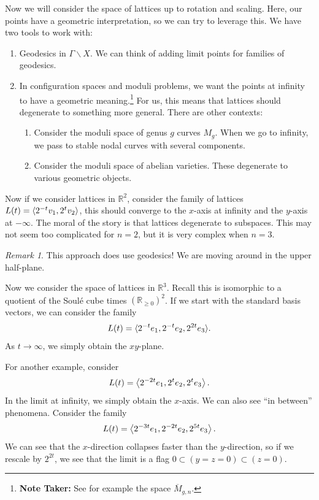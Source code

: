 \documentclass[leqno, openany]{memoir}
\DeclarePairedDelimiter{\gen}{\langle}{\rangle}
\theoremstyle{definition}
\theoremstyle{remark}
\newtheorem{rmk}[thm]{Remark}
\theoremstyle{plain}
\theoremstyle{definition}
\theoremstyle{remark}
\newcommand{\R}{\mathbb{R}}
\begin{document}
Now we will consider the space of lattices up to rotation and scaling. Here, our points have a geometric interpretation, so we can try to leverage this. We have two tools to work with:
\begin{enumerate}
    \item Geodesics in $\Gamma \backslash X$. We can think of adding limit points for families of geodesics.
    \item In configuration spaces and moduli problems, we want the points at infinity to have a geometric meaning.\footnote{\textbf{Note Taker:} See for example the space $\overline{M}_{g,n}$.} For us, this means that lattices should degenerate to something more general. There are other contexts:
    \begin{enumerate}
        \item Consider the moduli space of genus $g$ curves $M_g$. When we go to infinity, we pass to stable nodal curves with several components.
        \item Consider the moduli space of abelian varieties. These degenerate to various geometric objects.
    \end{enumerate}
\end{enumerate}

Now if we consider lattices in $\R^2$, consider the family of lattices $L(t) = \ev{2^{-t} v_1, 2^t v_2}$, this should converge to the $x$-axis at infinity and the $y$-axis at $-\infty$. The moral of the story is that lattices degenerate to subspaces. This may not seem too complicated for $n=2$, but it is very complex when $n=3$.

\begin{rmk}
    This approach does use geodesics! We are moving around in the upper half-plane.
\end{rmk}

Now we consider the space of lattices in $\R^3$. Recall this is isomorphic to a quotient of the Soul\'e cube times $(\R_{\geq 0})^2$. If we start with the standard basis vectors, we can consider the family 
\[ L(t) = \gen{2^{-t} e_1, 2^{-t}e_2, 2^{2t}e_3}.\] 
As $t \to \infty$, we simply obtain the $xy$-plane.

For another example, consider 
\[ L(t) = \ev{2^{-2t}e_1, 2^t e_2, 2^t e_3} .\] In the limit at infinity, we simply obtain the $x$-axis. We can also see ``in between'' phenomena. Consider the family 
\[ L(t) = \ev{2^{-3t}e_1, 2^{-2t} e_2, 2^{5t} e_3}. \]
We can see that the $x$-direction collapses faster than the $y$-direction, so if we rescale by $2^{2t}$, we see that the limit is a flag $0 \subset (y=z=0) \subset (z=0)$. 
\end{document}
